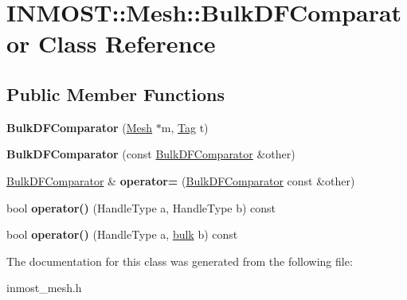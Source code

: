 \hypertarget{classINMOST_1_1Mesh_1_1BulkDFComparator}{\section{I\-N\-M\-O\-S\-T\-:\-:Mesh\-:\-:Bulk\-D\-F\-Comparator Class Reference}
\label{classINMOST_1_1Mesh_1_1BulkDFComparator}
}
\subsection*{Public Member Functions}
\begin{DoxyCompactItemize}
\item 
\hypertarget{classINMOST_1_1Mesh_1_1BulkDFComparator_a1ea561959bc8330c64ebde348246ef8f}{{\bfseries Bulk\-D\-F\-Comparator} (\hyperlink{classINMOST_1_1Mesh}{Mesh} $\ast$m, \hyperlink{classINMOST_1_1Tag}{Tag} t)}\label{classINMOST_1_1Mesh_1_1BulkDFComparator_a1ea561959bc8330c64ebde348246ef8f}

\item 
\hypertarget{classINMOST_1_1Mesh_1_1BulkDFComparator_a35287407077b8c2cb3ef9386fa703be4}{{\bfseries Bulk\-D\-F\-Comparator} (const \hyperlink{classINMOST_1_1Mesh_1_1BulkDFComparator}{Bulk\-D\-F\-Comparator} \&other)}\label{classINMOST_1_1Mesh_1_1BulkDFComparator_a35287407077b8c2cb3ef9386fa703be4}

\item 
\hypertarget{classINMOST_1_1Mesh_1_1BulkDFComparator_a5270c6dd150e328188630b282afd67dc}{\hyperlink{classINMOST_1_1Mesh_1_1BulkDFComparator}{Bulk\-D\-F\-Comparator} \& {\bfseries operator=} (\hyperlink{classINMOST_1_1Mesh_1_1BulkDFComparator}{Bulk\-D\-F\-Comparator} const \&other)}\label{classINMOST_1_1Mesh_1_1BulkDFComparator_a5270c6dd150e328188630b282afd67dc}

\item 
\hypertarget{classINMOST_1_1Mesh_1_1BulkDFComparator_a714397aff2fb2191ad02921b22fca995}{bool {\bfseries operator()} (Handle\-Type a, Handle\-Type b) const }\label{classINMOST_1_1Mesh_1_1BulkDFComparator_a714397aff2fb2191ad02921b22fca995}

\item 
\hypertarget{classINMOST_1_1Mesh_1_1BulkDFComparator_ab716d607a57a5c2e2f549d6639f97fff}{bool {\bfseries operator()} (Handle\-Type a, \hyperlink{classINMOST_1_1Storage_ae429556af77094077d212e0ac23c8cfc}{bulk} b) const }\label{classINMOST_1_1Mesh_1_1BulkDFComparator_ab716d607a57a5c2e2f549d6639f97fff}

\end{DoxyCompactItemize}


The documentation for this class was generated from the following file\-:\begin{DoxyCompactItemize}
\item 
inmost\-\_\-mesh.\-h\end{DoxyCompactItemize}
